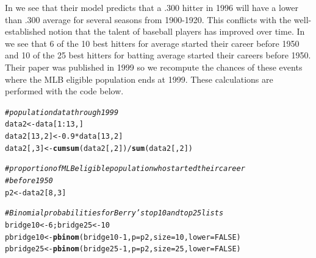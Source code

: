 \documentclass[11pt]{article}\usepackage[]{graphicx}\usepackage[]{color}
\makeatletter
\newcommand{\hlnum}[1]{\textcolor[rgb]{0.686,0.059,0.569}{#1}}%
\newcommand{\hlcom}[1]{\textcolor[rgb]{0.678,0.584,0.686}{\textit{#1}}}%
\newcommand{\hlopt}[1]{\textcolor[rgb]{0,0,0}{#1}}%
\newcommand{\hlstd}[1]{\textcolor[rgb]{0.345,0.345,0.345}{#1}}%
\newcommand{\hlkwb}[1]{\textcolor[rgb]{0.69,0.353,0.396}{#1}}%
\newcommand{\hlkwc}[1]{\textcolor[rgb]{0.333,0.667,0.333}{#1}}%
\newcommand{\hlkwd}[1]{\textcolor[rgb]{0.737,0.353,0.396}{\textbf{#1}}}%
\newenvironment{kframe}{%
 \def\at@end@of@kframe{}%
 \ifinner\ifhmode%
  \def\at@end@of@kframe{\end{minipage}}%
  \begin{minipage}{\columnwidth}%
 \fi\fi%
 \def\FrameCommand##1{\hskip\@totalleftmargin \hskip-\fboxsep
 \colorbox{shadecolor}{##1}\hskip-\fboxsep
     \hskip-\linewidth \hskip-\@totalleftmargin \hskip\columnwidth}%
 \MakeFramed {\advance\hsize-\width
   \@totalleftmargin\z@ \linewidth\hsize
   \@setminipage}}%
 {\par\unskip\endMakeFramed%
 \at@end@of@kframe}
\newenvironment{knitrout}{}{} %
\makeatother
\begin{document}
In \citet[panel (c) of Figure 7]{berry1999eras} we see that their model 
predicts that a .300 hitter in 1996 will have a lower than .300 average for 
several seasons from 1900-1920.  This conflicts with the well-established 
notion that the talent of baseball players has improved over time.  
In \citet[Table 9]{berry1999eras} we see that 6 of the 10 best hitters 
for average started their career before 1950 and 10 of the 25 best hitters 
for batting average started their careers before 1950.  Their paper was 
published in 1999 so we recompute the chances of these events where the MLB 
eligible population ends at 1999. %
These calculations are performed with the code below.

\begin{knitrout}
\color{fgcolor}\begin{kframe}
\begin{alltt}
\hlcom{# population data through 1999}
\hlstd{data2} \hlkwb{<-} \hlstd{data[}\hlnum{1}\hlopt{:}\hlnum{13}\hlstd{, ]}
\hlstd{data2[}\hlnum{13}\hlstd{,} \hlnum{2}\hlstd{]} \hlkwb{<-} \hlnum{0.9} \hlopt{*} \hlstd{data[}\hlnum{13}\hlstd{,} \hlnum{2}\hlstd{]}
\hlstd{data2[,} \hlnum{3}\hlstd{]} \hlkwb{<-} \hlkwd{cumsum}\hlstd{(data2[,} \hlnum{2}\hlstd{])} \hlopt{/} \hlkwd{sum}\hlstd{(data2[,} \hlnum{2}\hlstd{])}

\hlcom{# proportion of MLB eligible population who started their career }
\hlcom{# before 1950}
\hlstd{p2} \hlkwb{<-} \hlstd{data2[}\hlnum{8}\hlstd{,} \hlnum{3}\hlstd{]}

\hlcom{# Binomial probabilities for Berry's top 10 and top 25 lists}
\hlstd{bridge10} \hlkwb{<-} \hlnum{6}\hlstd{; bridge25} \hlkwb{<-} \hlnum{10}
\hlstd{pbridge10} \hlkwb{<-} \hlkwd{pbinom}\hlstd{(bridge10} \hlopt{-} \hlnum{1}\hlstd{,} \hlkwc{p} \hlstd{= p2,} \hlkwc{size} \hlstd{=} \hlnum{10}\hlstd{,} \hlkwc{lower} \hlstd{=} \hlnum{FALSE}\hlstd{)}
\hlstd{pbridge25} \hlkwb{<-} \hlkwd{pbinom}\hlstd{(bridge25} \hlopt{-} \hlnum{1}\hlstd{,} \hlkwc{p} \hlstd{= p2,} \hlkwc{size} \hlstd{=} \hlnum{25}\hlstd{,} \hlkwc{lower} \hlstd{=} \hlnum{FALSE}\hlstd{)}
\end{alltt}
\end{kframe}
\end{knitrout}
\end{document}
